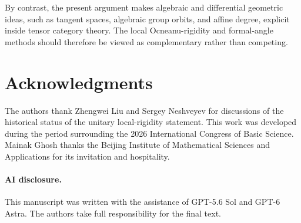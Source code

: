 \documentclass[11pt]{amsart}
\theoremstyle{definition}
\theoremstyle{remark}
\begin{document}
By contrast, the present argument makes algebraic and differential geometric
ideas, such as tangent spaces, algebraic group orbits, and affine degree,
explicit inside tensor category theory.  The local Ocneanu-rigidity and formal-angle
methods should therefore be viewed as complementary rather than competing.
\section*{Acknowledgments}
The authors thank Zhengwei Liu and Sergey Neshveyev for discussions of the
historical status of the unitary local-rigidity statement.
This work was developed during the period surrounding the 2026 International
Congress of Basic Science.  Mainak Ghosh thanks the Beijing Institute of
Mathematical Sciences and Applications for its invitation and hospitality.
\paragraph{AI disclosure.}
This manuscript was written with the assistance of GPT-5.6 Sol and
GPT-6 Astra.  The authors take full responsibility for the final text.
\end{document}
